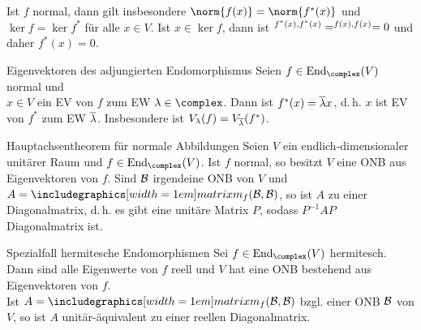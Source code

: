 \begin{Kor}
    Ist $f$ normal, dann gilt insbesondere $\norm{f(x)} = \norm{f^\ast(x)}$
    und $\ker f = \ker f^\ast$ für alle $x \in V$.
    Ist $x \in \ker f$, dann ist $\sp{f^\ast(x), f^\ast(x)} =
    \sp{f(x), f(x)} = 0$ und daher $f^\ast(x) = 0$.
\end{Kor}

\begin{Satz}{Eigenvektoren des adjungierten Endomorphismus}
    Seien $f \in \End_\complex(V)$ normal und \\
    $x \in V$ ein EV von $f$ zum EW $\lambda \in \complex$.
    Dann ist $f^\ast(x) = \overline{\lambda}x$, d.\,h. $x$ ist EV von $f^\ast$ zum
    EW $\overline{\lambda}$.
    Insbesondere ist $V_\lambda(f) = V_{\overline{\lambda}}(f^\ast)$.
\end{Satz}

\begin{Satz}{Hauptachsentheorem für normale Abbildungen}
    Seien $V$ ein endlich-dimensionaler unitärer Raum und
    $f \in \End_\complex(V)$.
    Ist $f$ normal, so besitzt $V$ eine ONB aus Eigenvektoren von $f$.
    Sind $\mathcal{B}$ irgendeine ONB von $V$ und $A = \hommatrix{f}{B}{B}$, so
    ist $A$  zu einer Diagonalmatrix,
    d.\,h. es gibt eine
    unitäre Matrix $P$, sodass $P^{-1} A P$ Diagonalmatrix ist.
\end{Satz}

\begin{Satz}{Spezialfall hermitesche Endomorphismen}
    Sei $f \in \End_\complex(V)$ hermitesch.
    Dann sind alle Eigenwerte von $f$ reell und $V$ hat eine ONB bestehend
    aus Eigenvektoren von $f$. \\
    Ist $A = \hommatrix{f}{B}{B}$ bzgl. einer ONB $\mathcal{B}$ von $V$, so ist
    $A$ unitär-äquivalent zu einer reellen Diagonalmatrix.
\end{Satz}

\pagebreak
